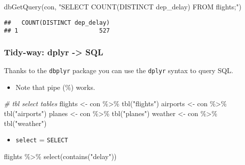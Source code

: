 \documentclass[
]{book}
\newenvironment{Shaded}{\begin{snugshade}}{\end{snugshade}}
\newcommand{\CommentTok}[1]{\textcolor[rgb]{0.56,0.35,0.01}{\textit{#1}}}
\newcommand{\FunctionTok}[1]{\textcolor[rgb]{0.00,0.00,0.00}{#1}}
\newcommand{\NormalTok}[1]{#1}
\newcommand{\OtherTok}[1]{\textcolor[rgb]{0.56,0.35,0.01}{#1}}
\newcommand{\SpecialCharTok}[1]{\textcolor[rgb]{0.00,0.00,0.00}{#1}}
\newcommand{\StringTok}[1]{\textcolor[rgb]{0.31,0.60,0.02}{#1}}
\providecommand{\tightlist}{%
  \setlength{\itemsep}{0pt}\setlength{\parskip}{0pt}}
\begin{document}
\begin{Shaded}
\begin{Highlighting}[]
\FunctionTok{dbGetQuery}\NormalTok{(con, }
           \StringTok{"SELECT COUNT(DISTINCT dep\_delay)}
\StringTok{           FROM flights;"}\NormalTok{)}
\end{Highlighting}
\end{Shaded}

\begin{verbatim}
##   COUNT(DISTINCT dep_delay)
## 1                       527
\end{verbatim}

\hypertarget{tidy-way-dplyr---sql}{%
\subsubsection{Tidy-way: dplyr -\textgreater{} SQL}\label{tidy-way-dplyr---sql}}

Thanks to the \texttt{dbplyr} package you can use the \texttt{dplyr} syntax to query SQL.

\begin{itemize}
\tightlist
\item
  Note that pipe (\%) works.
\end{itemize}

\begin{Shaded}
\begin{Highlighting}[]
\CommentTok{\# tbl select tables}
\NormalTok{flights }\OtherTok{\textless{}{-}}\NormalTok{ con }\SpecialCharTok{\%\textgreater{}\%} \FunctionTok{tbl}\NormalTok{(}\StringTok{"flights"}\NormalTok{)}
\NormalTok{airports }\OtherTok{\textless{}{-}}\NormalTok{ con }\SpecialCharTok{\%\textgreater{}\%} \FunctionTok{tbl}\NormalTok{(}\StringTok{"airports"}\NormalTok{)}
\NormalTok{planes }\OtherTok{\textless{}{-}}\NormalTok{ con }\SpecialCharTok{\%\textgreater{}\%} \FunctionTok{tbl}\NormalTok{(}\StringTok{"planes"}\NormalTok{)}
\NormalTok{weather }\OtherTok{\textless{}{-}}\NormalTok{ con }\SpecialCharTok{\%\textgreater{}\%} \FunctionTok{tbl}\NormalTok{(}\StringTok{"weather"}\NormalTok{)}
\end{Highlighting}
\end{Shaded}

\begin{itemize}
\tightlist
\item
  \texttt{select} = \texttt{SELECT}
\end{itemize}

\begin{Shaded}
\begin{Highlighting}[]
\NormalTok{flights }\SpecialCharTok{\%\textgreater{}\%} 
  \FunctionTok{select}\NormalTok{(}\FunctionTok{contains}\NormalTok{(}\StringTok{"delay"}\NormalTok{))}
\end{Highlighting}
\end{Shaded}
\end{document}
